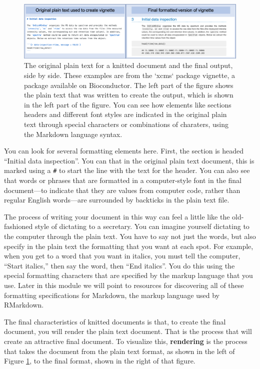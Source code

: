 \documentclass[]{tufte-book}
\begin{document}
\begin{figure}
\includegraphics[width=\textwidth]{figures/originalandfinal} \caption[The original plain text for a knitted document and the final output, side by side]{The original plain text for a knitted document and the final output, side by side. These examples are from the `xcms` package vignette, a package available on Bioconductor. The left part of the figure shows the plain text that was written to create the output, which is shown in the left part of the figure. You can see how elements like sections headers and different font styles are indicated in the original plain text through special characters or combinations of charaters, using the Markdown language syntax.}\label{fig:xcmsbothversions}
\end{figure}

You can look for several formatting elements here. First, the section is headed
``Initial data inspection''. You can that in the original plain text document,
this is marked using a \texttt{\#} to start the line with the text for the header. You
can also see that words or phrases that are formatted in a computer-style font
in the final document---to indicate that they are values from computer code,
rather than regular English words---are surrounded by backticks in the plain
text file.

The process of writing your document in this way can feel a little like the
old-fashioned style of dictating to a secretary. You can imagine yourself
dictating to the computer through the plain text. You have to say not just the
words, but also specify in the plain text the formatting that you want at each
spot. For example, when you get to a word that you want in italics, you must
tell the computer, ``Start italics,'' then say the word, then ``End italics''. You
do this using the special formatting characters that are specified by the markup
language that you use. Later in this module we will point to resources for
discovering all of these formatting specifications for Markdown, the markup
language used by RMarkdown.

The final characteristics of knitted documents is that, to create the final
document, you will render the plain text document. That is the process that will
create an attractive final document. To visualize this, \textbf{rendering} is the
process that takes the document from the plain text format, as shown in the left
of Figure \ref{fig:xcmsbothversions}, to the final format, shown in the right
of that figure.
\end{document}

